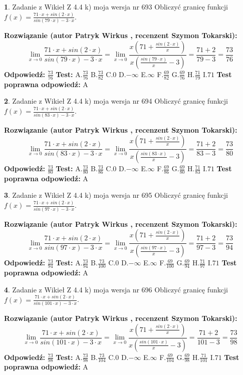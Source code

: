 \documentclass[12pt, a4paper]{article}
\theoremstyle{definition} %
\newtheorem{zad}{}
\newcommand{\zadStart}[1]{\begin{zad}#1\newline}
\newcommand{\zadStop}{\end{zad}}
\newcommand{\rozwStart}[2]{\noindent \textbf{Rozwiązanie (autor #1 , recenzent #2): }\newline}
\newcommand{\rozwStop}{\newline}
\newcommand{\odpStart}{\noindent \textbf{Odpowiedź:}\newline}
\newcommand{\odpStop}{\newline}
\newcommand{\testStart}{\noindent \textbf{Test:}\newline}
\newcommand{\testStop}{\newline}
\newcommand{\kluczStart}{\noindent \textbf{Test poprawna odpowiedź:}\newline}
\newcommand{\kluczStop}{\newline}
\begin{document}
\zadStart{Zadanie z Wikieł Z 4.4 k) moja wersja nr 693}
Obliczyć granicę funkcji $f(x)=\frac{71\cdot x +sin(2\cdot x)}{sin(79\cdot x) -3\cdot x}$.
\zadStop
\rozwStart{Patryk Wirkus}{Szymon Tokarski}
$$\lim\limits_{x\to 0}\frac{71\cdot x +sin(2\cdot x)}{sin(79\cdot x) -3\cdot x}
=\lim\limits_{x\to 0}\frac{x(71+\frac{sin(2\cdot x)}{x})}{x(\frac{sin(79\cdot x)}{x}-3)}
=\frac{71+2}{79-3} = \frac{73}{76}$$
\rozwStop
\odpStart
$\frac{73}{76}$
\odpStop
\testStart
A.$\frac{73}{76}$
B.$\frac{73}{82}$
C.$0$
D.$-\infty$
E.$\infty$
F.$\frac{69}{82}$
G.$\frac{69}{76}$
H.$\frac{71}{79}$
I.$71$
\testStop
\kluczStart
A
\kluczStop



\zadStart{Zadanie z Wikieł Z 4.4 k) moja wersja nr 694}
Obliczyć granicę funkcji $f(x)=\frac{71\cdot x +sin(2\cdot x)}{sin(83\cdot x) -3\cdot x}$.
\zadStop
\rozwStart{Patryk Wirkus}{Szymon Tokarski}
$$\lim\limits_{x\to 0}\frac{71\cdot x +sin(2\cdot x)}{sin(83\cdot x) -3\cdot x}
=\lim\limits_{x\to 0}\frac{x(71+\frac{sin(2\cdot x)}{x})}{x(\frac{sin(83\cdot x)}{x}-3)}
=\frac{71+2}{83-3} = \frac{73}{80}$$
\rozwStop
\odpStart
$\frac{73}{80}$
\odpStop
\testStart
A.$\frac{73}{80}$
B.$\frac{73}{86}$
C.$0$
D.$-\infty$
E.$\infty$
F.$\frac{69}{86}$
G.$\frac{69}{80}$
H.$\frac{71}{83}$
I.$71$
\testStop
\kluczStart
A
\kluczStop



\zadStart{Zadanie z Wikieł Z 4.4 k) moja wersja nr 695}
Obliczyć granicę funkcji $f(x)=\frac{71\cdot x +sin(2\cdot x)}{sin(97\cdot x) -3\cdot x}$.
\zadStop
\rozwStart{Patryk Wirkus}{Szymon Tokarski}
$$\lim\limits_{x\to 0}\frac{71\cdot x +sin(2\cdot x)}{sin(97\cdot x) -3\cdot x}
=\lim\limits_{x\to 0}\frac{x(71+\frac{sin(2\cdot x)}{x})}{x(\frac{sin(97\cdot x)}{x}-3)}
=\frac{71+2}{97-3} = \frac{73}{94}$$
\rozwStop
\odpStart
$\frac{73}{94}$
\odpStop
\testStart
A.$\frac{73}{94}$
B.$\frac{73}{100}$
C.$0$
D.$-\infty$
E.$\infty$
F.$\frac{69}{100}$
G.$\frac{69}{94}$
H.$\frac{71}{97}$
I.$71$
\testStop
\kluczStart
A
\kluczStop



\zadStart{Zadanie z Wikieł Z 4.4 k) moja wersja nr 696}
Obliczyć granicę funkcji $f(x)=\frac{71\cdot x +sin(2\cdot x)}{sin(101\cdot x) -3\cdot x}$.
\zadStop
\rozwStart{Patryk Wirkus}{Szymon Tokarski}
$$\lim\limits_{x\to 0}\frac{71\cdot x +sin(2\cdot x)}{sin(101\cdot x) -3\cdot x}
=\lim\limits_{x\to 0}\frac{x(71+\frac{sin(2\cdot x)}{x})}{x(\frac{sin(101\cdot x)}{x}-3)}
=\frac{71+2}{101-3} = \frac{73}{98}$$
\rozwStop
\odpStart
$\frac{73}{98}$
\odpStop
\testStart
A.$\frac{73}{98}$
B.$\frac{73}{104}$
C.$0$
D.$-\infty$
E.$\infty$
F.$\frac{69}{104}$
G.$\frac{69}{98}$
H.$\frac{71}{101}$
I.$71$
\testStop
\kluczStart
A
\kluczStop
\end{document}
